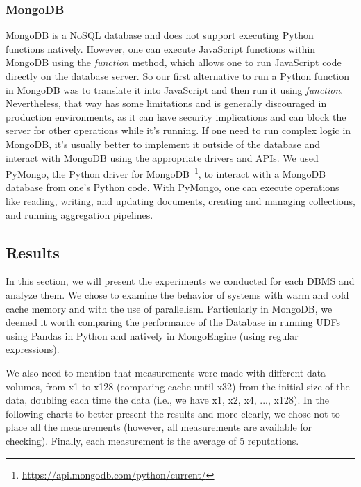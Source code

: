 \subsubsection{MongoDB}
MongoDB is a NoSQL database and does not support executing Python functions
natively. 
However, one can execute JavaScript functions within MongoDB using the 
\emph {function} 
method, which allows one to run JavaScript code directly on the database server.
So our first alternative to run a Python function in MongoDB was to
translate it into JavaScript and then run it using \emph{function}. 
Nevertheless, that way has some limitations and is generally discouraged in production environments, 
as it can have security implications and can block the server for other operations while it's running. 
If one need to run complex logic in MongoDB, 
it's usually better to implement it outside of the database and interact with MongoDB 
using the appropriate drivers and APIs.
We used PyMongo, the Python driver for MongoDB~\footnote{\url{https://api.mongodb.com/python/current/}},
to interact with a MongoDB database from one's Python code. 
With PyMongo, one can execute operations like reading, writing, and updating documents, 
creating and managing collections, and running aggregation pipelines.


\subsection{Results}

In this section, we will present the experiments we conducted for each DBMS and analyze them. 
We chose to examine the behavior of systems with warm and cold cache memory and with the use of parallelism. 
Particularly in MongoDB, we deemed it worth comparing the performance of the Database in running UDFs using 
Pandas in Python and natively in MongoEngine (using regular expressions).

We also need to mention that measurements were made with different data volumes, 
from x1 to x128 (comparing cache until x32) from the initial size of the data, 
doubling each time the data (i.e., we have x1, x2, x4, ..., x128). 
In the following charts to better present the results and more clearly, we chose not to place all the measurements 
(however, all measurements are available for checking). Finally, each measurement is the average of 5 reputations.

